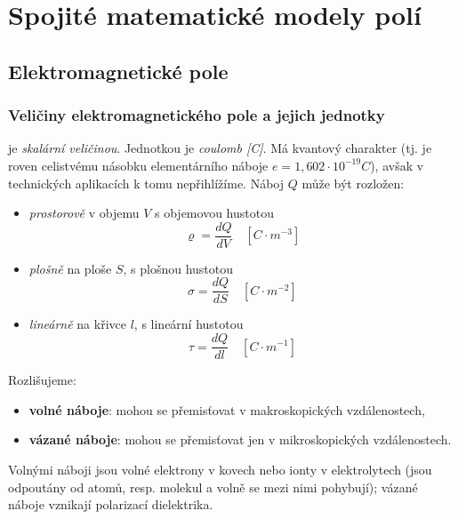 \setchaptertoc
\chapter{Spojité matematické modely polí}

  \section{Elektromagnetické pole}
    \subsection{Veličiny elektromagnetického pole a jejich jednotky}
       je \emph{skalární veličinou}. Jednotkou je \emph{coulomb [C]}. Má
         kvantový charakter (tj. je roven celistvému násobku elementárního náboje $e =
         1,602\cdot10^{-19}C$), avšak v technických aplikacích k tomu nepřihlížíme. Náboj $Q$
         může být rozložen:
         \begin{itemize}[noitemsep]
            \item \emph{prostorově} v objemu $V$ s objemovou hustotou
               \begin{equation}\label{TEMP:eq_q_varrho}
                  \varrho = \frac{dQ}{dV} \quad [C\cdot m^{-3}]
               \end{equation}               
            \item \emph{plošně} na ploše $S$, s plošnou hustotou
               \begin{equation}\label{TEMP:eq_q_sigma}
                  \sigma = \frac{dQ}{dS} \quad [C\cdot m^{-2}]
               \end{equation}                 
            \item \emph{lineárně} na křivce $l$, s lineární hustotou
               \begin{equation}\label{TEMP:eq_q_tau}
                  \tau = \frac{dQ}{dl} \quad [C\cdot m^{-1}]
               \end{equation}                 
         \end{itemize}
         Rozlišujeme:
           \begin{itemize}[noitemsep]
             \item \textbf{volné náboje}: mohou se přemisťovat v makroskopických
             vzdálenostech,
             \item \textbf{vázané náboje}: mohou se přemisťovat jen v
             mikroskopických vzdálenostech.
           \end{itemize}
         Volnými náboji jsou volné elektrony v kovech nebo ionty v elektrolytech (jsou odpoutány od
         atomů, resp. molekul a volně se mezi nimi pohybují); vázané náboje vznikají polarizací
         dielektrika.
         
